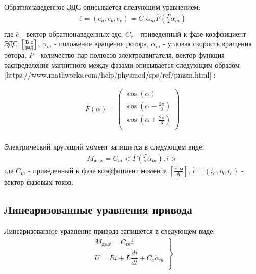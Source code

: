 {Обратнонаведенное ЭДС описывается следующим уравнением:
\begin{equation}
\label{eq:p3:9.2}
\begin{alignedat}{2}
\overline{e} = (e_a, e_b, e_c) = C_e \dot{\alpha}_m \overline{F}(\frac{\textit{P}}{2}\alpha_m)\\
\end{alignedat}
\end{equation}
где 
$\overline{e}$ - вектор обратнонаведенных эдс, 
$C_e$ - приведенный к фазе коэффициент ЭДС $[\frac{\textit{В с}}{\textit{рад}} ]$,
$\alpha_m$ - положение вращения ротора, 
$\dot{\alpha}_m$ - угловая скорость вращения ротора, 
$\textit{P}$ - количество пар полюсов электродвигателя, 
вектор-функция распределения магнитного между фазами описывается следующим образом
 [https://www.mathworks.com/help/physmod/sps/ref/pmsm.html]
:

\begin{equation}
\label{eq:p3:9.3}
\begin{alignedat}{2}
\overline{F}(\alpha) = \left( \begin{matrix}
\cos (\alpha) \\
\cos (\alpha - \frac{2 \pi}{3}) \\
\cos (\alpha + \frac{2 \pi}{3}) \\
\end{matrix}
\right) \\
\end{alignedat}
\end{equation}

Электрический крутящий момент запишется в следующем виде:
\begin{equation}
\label{eq:p3:9.4}
\begin{alignedat}{2}
M_{\textit{дв.x}} = C_m <\overline{F}(\frac{\textit{P}}{2}\alpha_m),\overline{i}>
\end{alignedat}
\end{equation}
где
$C_m$ - приведенный к фазе коэффициент момента $[\frac{\textit{Н м}}{\textit{А}} ]$,
$\overline{i} = (i_a, i_b, i_c)$ - вектор фазовых токов.

\subsection{Линеаризованные уравнения привода} \label{sec:ch3/sec9/linearize}

Линеаризованное уравнение привода запишется в следующем виде:
\begin{equation}
\label{eq:p3:lin1}
\begin{alignedat}{2}
\left.
\begin{matrix}
M_{\textit{дв.x}} = C_m i\\
U = R i + L \dfrac{d i}{dt} + C_e \dot{\alpha}_m \\
\end{matrix}
\right\rbrace 
\end{alignedat}
\end{equation}

}
